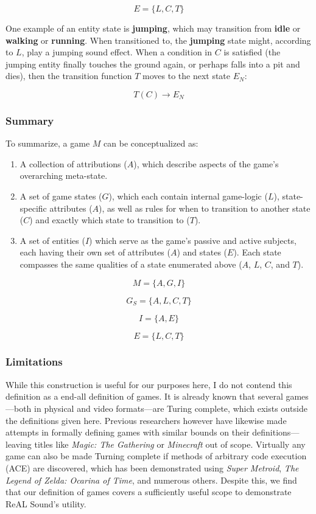 \documentclass{report}
\newcommand{\rs}{ReAL Sound\xspace}
\begin{document}
$$E = \{L, C, T\}$$

One example of an entity state is \textbf{jumping}, which may transition from \textbf{idle} or \textbf{walking} or \textbf{running}. When transitioned to, the \textbf{jumping} state might, according to $L$, play a jumping sound effect. When a condition in $C$ is satisfied (the jumping entity finally touches the ground again, or perhaps falls into a pit and dies), then the transition function $T$ moves to the next state $E_N$:

$$T(C) \longrightarrow E_N$$

\subsubsection{Summary}
To summarize, a game $M$ can be conceptualized as:

\begin{enumerate}
    \item A collection of attributions ($A$), which describe aspects of the game's overarching meta-state.
    \item A set of game states ($G$), which each contain internal game-logic ($L$), state-specific attributes ($A$), as well as rules for when to transition to another state ($C$) and exactly which state to transition to ($T$).   
    \item A set of entities ($I$) which serve as the game's passive and active subjects, each having their own set of attributes ($A$) and states ($E$). Each state compasses the same qualities of a state enumerated above ($A$, $L$, $C$, and $T$).   
\end{enumerate}

$$
M = \{A, G, I\}
$$

$$
G_S = \{ A, L, C, T \}
$$

$$I = \{A, E\}$$

$$E = \{L, C, T\}$$


\subsubsection{Limitations}
While this construction is useful for our purposes here, I do not contend this definition as a end-all definition of games. It is already known that several games---both in physical and video formats---are Turing complete, which exists outside the definitions given here. Previous researchers however have likewise made attempts in formally defining games with similar bounds on their definitions---leaving titles like \emph{Magic: The Gathering}\cite{churchill2019magicgatheringturingcomplete} or \emph{Minecraft}\cite{Hildreth1980} out of scope\cite{Demaine}. Virtually any game can also be made Turning complete if methods of arbitrary code execution (ACE) are discovered, which has been demonstrated using \emph{Super Metroid}\cite{Mawhorter_Aytemiz_Karth_Smith_2021}, \emph{The Legend of Zelda: Ocarina of Time}\cite{OoT}, and numerous others. Despite this, we find that our definition of games covers a sufficiently useful scope to demonstrate \rs's utility.
\end{document}

